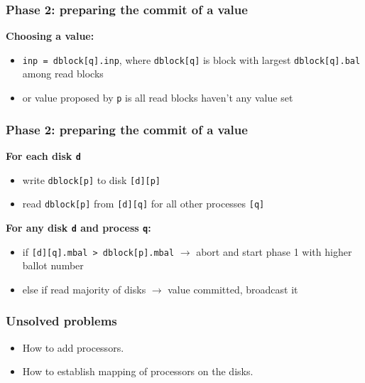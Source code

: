\documentclass[10pt,utf8]{beamer}
\begin{document}
\begin{frame}
    \frametitle{Phase 2: preparing the commit of a value}
    \centering
    \textbf{Choosing a value:}
    \vspace{0.5cm}
    \begin{itemize}
     \item \texttt{inp = dblock[q].inp}, where \texttt{dblock[q]} is block with largest \texttt{dblock[q].bal} among read blocks
     \item or value proposed by \texttt{p} is all read blocks haven't any value set
    \end{itemize}
\end{frame}

\begin{frame}
    \frametitle{Phase 2: preparing the commit of a value}
    
    \centering
    \textbf{For each disk \texttt{d}}
    \vspace{0.5cm}
    \begin{itemize}
        \item write \texttt{dblock[p]} to disk \texttt{[d][p]}
        \item read \texttt{dblock[p]} from \texttt{[d][q]} for all other processes \texttt{[q]}
    \end{itemize}
    
    \vspace{1cm}
    
    \centering
    \textbf{For any disk \texttt{d} and process \texttt{q}:}
    \vspace{0.5cm}
    \begin{itemize}
        \item if \texttt{[d][q].mbal > dblock[p].mbal} $\rightarrow$ abort and start phase 1 with higher ballot number
        \item else if read majority of disks $\rightarrow$ value committed, broadcast it
    \end{itemize}
\end{frame}


\begin{frame}
  \frametitle{Unsolved problems}
  \begin{itemize}
    \item How to add processors.
    \item How to establish mapping of processors on the disks.
  \end{itemize}
\end{frame}
\end{document}
